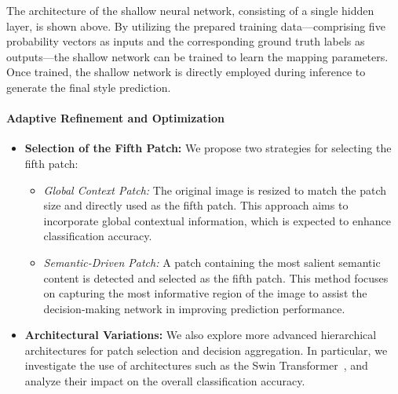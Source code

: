 The architecture of the shallow neural network, consisting of a single hidden
layer, is shown above. By utilizing the prepared training data—comprising five
probability vectors as inputs and the corresponding ground truth labels as
outputs—the shallow network can be trained to learn the mapping parameters.
Once trained, the shallow network is directly employed during inference to
generate the final style prediction.
\paragraph{Adaptive Refinement and Optimization}
\begin{itemize} \item \textbf{Selection of the Fifth Patch:}
          We propose two strategies for selecting the fifth patch: \begin{itemize} \item \textit{Global Context Patch:} The original image is resized to match the patch size and directly used as the fifth patch. This approach aims to incorporate global contextual information, which is expected to enhance classification accuracy. \item \textit{Semantic-Driven Patch:} A patch containing the most salient semantic content is detected and selected as the fifth patch. This method focuses on capturing the most informative region of the image to assist the decision-making network in improving prediction performance. \end{itemize} \item \textbf{Architectural Variations:}
          We also explore more advanced hierarchical architectures for patch selection and decision aggregation. In particular, we investigate the use of architectures such as the Swin Transformer~\cite{9718928}, and analyze their impact on the overall classification accuracy. \end{itemize}